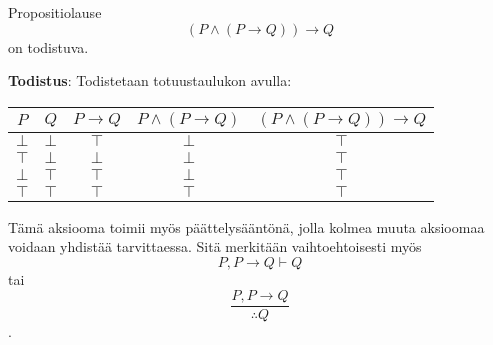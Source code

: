 \documentclass[a4paper,12pt]{amsart}
\begin{document}
\begin{lause}\label{mp}
Propositiolause
$$
(P\land (P\to Q))\to Q
$$
on todistuva.

{\bf Todistus}: Todistetaan totuustaulukon avulla:

\begin{tabular}{c|c|c|c|c}
$P$ & $Q$ & $P\to Q$ & $P\land (P\to Q)$ & $(P\land (P\to Q))\to Q$ \\
\hline
\hline
$\bot$ & $\bot$ & $\top$ & $\bot$ & $\top$ \\
\hline
$\top$ & $\bot$ & $\bot$ & $\bot$ & $\top$ \\
\hline
$\bot$ & $\top$ & $\top$ & $\bot$ & $\top$ \\
\hline
$\top$ & $\top$ & $\top$ & $\top$ & $\top$ \\
\hline
\end{tabular}

Tämä aksiooma toimii myös päättelysääntönä, jolla kolmea muuta aksioomaa voidaan yhdistää tarvittaessa. Sitä merkitään vaihtoehtoisesti myös
$$
P,P\to Q\vdash Q
$$
tai
$$
\frac{P,P\to Q}{\therefore Q}
$$.
\end{lause}
\end{document}
